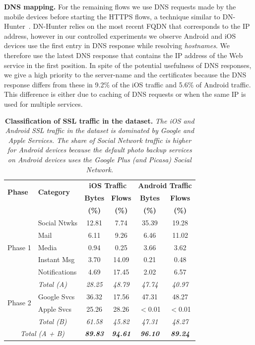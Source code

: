 \noindent\textbf{DNS mapping.} 
For the remaining flows we use DNS requests made by the mobile devices before starting the HTTPS flows, a technique similar to DN-Hunter~\cite{bermudez:dnhunter}.
DN-Hunter relies on the most recent FQDN that corresponds to the IP address, however in our controlled experiments we observe Android and iOS devices use the first entry in DNS response while resolving \emph{hostnames}.
We therefore use the latest DNS response that contains the IP address of the Web service in the first position.
In spite of the potential usefulness of DNS responses, we give a high priority to the server-name and the certificates because the DNS response differs from these in 9.2\% of the iOS traffic and 5.6\% of Android traffic.
This difference is either due to caching of DNS requests or when the same IP is used for multiple services. 

\begin{table}
\centering
\begin{small}
\begin{tabular}{|p{}|p{}|c|c|c|c|}
\hline
\multirow{2}{*}{\bf Phase} & \multirow{2}{*}{\bf Category} & \multicolumn{2}{c|}{\bf iOS Traffic} &  \multicolumn{2}{c|}{\bf Android Traffic} \tabularnewline
\cline{3-6}
 &         & {\bf Bytes}  & {\bf Flows} & {\bf Bytes} & {\bf Flows}   \tabularnewline
 &         & {\bf (\%)}  & {\bf (\%)} & {\bf (\%)} & {\bf (\%)}   \tabularnewline
\hline
\multirow{5}{*}{Phase 1}
& Social Ntwks    & 12.81 &  7.74 & 35.39 & 19.28 \tabularnewline
\cline{2-6}
& Mail               &  6.11 &  9.26 &  6.46 & 11.02 \tabularnewline
\cline{2-6}
& Media              &  0.94 &  0.25 &  3.66 &  3.62 \tabularnewline
\cline{2-6}
& Instant Msg   &  3.70 & 14.09 &  0.21 &  0.48 \tabularnewline
\cline{2-6}
& Notifications     &  4.69 & 17.45 &  2.02 &  6.57 \tabularnewline
\cline{2-6}
& \emph{Total (A) }       & {\em 28.25} & {\em 48.79} & {\em 47.74} & {\em 40.97} \tabularnewline
\hline
\multirow{2}{*}{Phase 2}
 & Google Svcs   & 36.32 & 17.56 & 47.31 & 48.27 \tabularnewline
\cline{2-6}
 & Apple Svcs    & 25.26 & 28.26 & $<$0.01 & $<$0.01 \tabularnewline
\cline{2-6}
\cline{2-6}
& \emph{Total (B) }       & {\em 61.58} & {\em 45.82} & {\em 47.31} & {\em 48.27} \tabularnewline
\hline
\multicolumn{2}{|c|}{\emph{Total (A + B)}}       & {\em \bf 89.83} & {\em\bf 94.61} & {\em\bf  96.10}  &  {\em\bf  89.24} \tabularnewline
\hline
\end{tabular}
\end{small}
\caption{\textbf{Classification of SSL traffic in the \mobWild dataset.} \emph{The iOS and Android SSL traffic in the \mobWild dataset is dominated by Google and Apple Services. The share of Social Network traffic is higher for Android devices because the default photo backup services on Android devices uses the Google Plus (and Picasa) Social Network.}}
\label{tab:classify-ssl-traffic}
\end{table}

